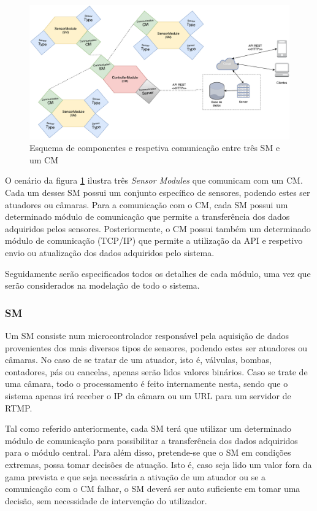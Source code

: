 \begin{figure}[h]
	\centering
	\includegraphics[width=0.9\linewidth]{esquemas/general-electronic-modules.pdf}
	\caption{Esquema de componentes e respetiva comunicação entre três \ac{SM} e um \ac{CM}}
	\label{esquema1}
\end{figure}

O cenário da figura \ref{esquema1} ilustra três \textit{Sensor Modules} que comunicam com um \acl{CM}. Cada um desses \acl{SM} possui um conjunto específico de sensores, podendo estes ser atuadores ou câmaras. Para a comunicação com o \acl{CM}, cada \acl{SM} possui um determinado módulo de comunicação que permite a transferência dos dados adquiridos pelos sensores. Posteriormente, o \acl{CM} possui também um determinado módulo de comunicação (\acs{TCP}/\acs{IP}) que permite a utilização da \ac{API} e respetivo envio ou atualização dos dados adquiridos pelo sistema. 

Seguidamente serão especificados todos os detalhes de cada módulo, uma vez que serão considerados na modelação de todo o sistema. 

\subsubsection{\acl{SM}}

Um \acl{SM} consiste num microcontrolador responsável pela aquisição de dados provenientes dos mais diversos tipos de sensores, podendo estes ser atuadores ou câmaras. No caso de se tratar de um atuador, isto é, válvulas, bombas, contadores, pás ou cancelas, apenas serão lidos valores binários. Caso se trate de uma câmara, todo o processamento é feito internamente nesta, sendo que o sistema apenas irá receber o \ac{IP} da câmara ou um \ac{URL} para um servidor de \ac{RTMP}.  


Tal como referido anteriormente, cada \acl{SM} terá que utilizar um determinado módulo de comunicação para possibilitar a transferência dos dados adquiridos para o módulo central. Para além disso, pretende-se que o \acl{SM} em condições extremas, possa tomar decisões de atuação. Isto é, caso seja lido um valor fora da gama prevista e que seja necessária a ativação de um atuador ou se a comunicação com o \acl{CM} falhar, o \acl{SM} deverá ser auto suficiente em tomar uma decisão, sem necessidade de intervenção do utilizador. 

